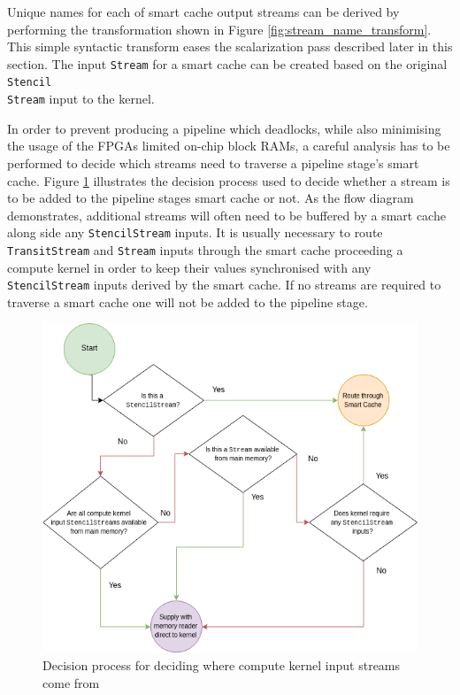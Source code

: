 \documentclass{mpaper}
\begin{document}
Unique names for each of smart cache output streams can be derived by performing the transformation shown in Figure \ref{fig:stream_name_transform}.
This simple syntactic transform eases the scalarization pass described later in this section.
The input \texttt{Stream} for a smart cache can be created based on the original \texttt{Stencil\\Stream} input to the kernel. 

In order to prevent producing a pipeline which deadlocks, while also minimising the usage of the FPGAs limited on-chip block RAMs, a careful analysis has to be performed to decide which streams need to traverse a pipeline stage's smart cache.
Figure \ref{fig:smart_cache_stream_routing} illustrates the decision process used to decide whether a stream is to be added to the pipeline stages smart cache or not. 
As the flow diagram demonstrates, additional streams will often need to be buffered by a smart cache along side any \texttt{StencilStream} inputs.
It is usually necessary to route \texttt{TransitStream} and \texttt{Stream} inputs through the smart cache proceeding a compute kernel in order to keep their values synchronised with any \texttt{StencilStream} inputs derived by the smart cache.
If no streams are required to traverse a smart cache one will not be added to the pipeline stage.

\begin{figure}
    \centering
    \includegraphics[scale=0.40]{images/Smart_cache_stream_routing.png}
    \caption{Decision process for deciding where compute kernel input streams come from}
    \label{fig:smart_cache_stream_routing}
\end{figure}
\end{document}
